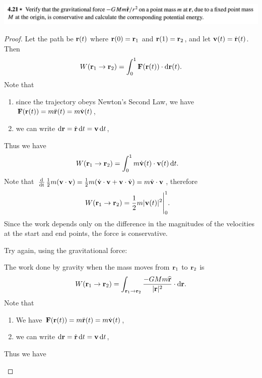 \begin{mdframed}
  \includegraphics[width=400pt]{img/physics--classical-mechanics--taylor--q-4-21.png}
\end{mdframed}

\begin{proof}
  Let the path be $\mathbf{r}(t)$ where $\mathbf{r}(0) = \mathbf{r}_1$ and $\mathbf{r}(1) = \mathbf{r}_2$, and let $\mathbf v(t) = \dot{\mathbf{r}}(t)$. Then
  \begin{align*}
    W(\r_1 \to \r_2) = \int_0^1 \F(\r(t)) \cdot \d\r(t).
  \end{align*}
  Note that
  \begin{enumerate}
  \item since the trajectory obeys Newton's Second Law, we have $\mathbf{F}(\mathbf{r}(t)) = m\ddot{\mathbf{r}}(t) = m\dot{\mathbf v}(t)$,
  \item we can write $\d\r = \dot{\r} \dt = \v \dt$,
  \end{enumerate}
  Thus we have
\begin{align*}
  W(\r_1 \to \r_2) &= \int_0^1 m\dot{\v}(t) \cdot \v(t) \dt.
\end{align*}
Note that $\operatorname{\frac{\text{d}}{\text{dt}}} \frac{1}{2}m(\mathbf v \cdot \mathbf v) = \frac{1}{2}m(\dot{\mathbf v} \cdot \mathbf v + \mathbf v \cdot \dot{\mathbf v}) = m\dot{\mathbf v} \cdot \mathbf v$, therefore
\begin{align*}
  W(\mathbf{r}_1 \to \mathbf{r}_2) &= \frac{1}{2}m|\mathbf v(t)|^2\Bigg|_0^1.
\end{align*}
Since the work depends only on the difference in the magnitudes of the velocities at the start and
end points, the force is conservative.


\begin{mdframed}
  Try again, using the gravitational force:

  The work done by gravity when the mass moves from $\mathbf{r}_1$ to $\mathbf{r}_2$ is
  \begin{align*}
    W(\r_1 \to \r_2) = \int_{\r_1 \to \r_2} \frac{-GMm\hat{\r}}{|\r|^2} \cdot \d\r.
  \end{align*}
  Note that
  \begin{enumerate}
  \item We have $\mathbf{F}(\mathbf{r}(t)) = m\ddot{\mathbf{r}}(t) = m\dot{\mathbf v}(t)$,
  \item we can write $\d\r = \dot{\r} \dt = \v \dt$,
  \end{enumerate}
  Thus we have

\end{mdframed}

\end{proof}


